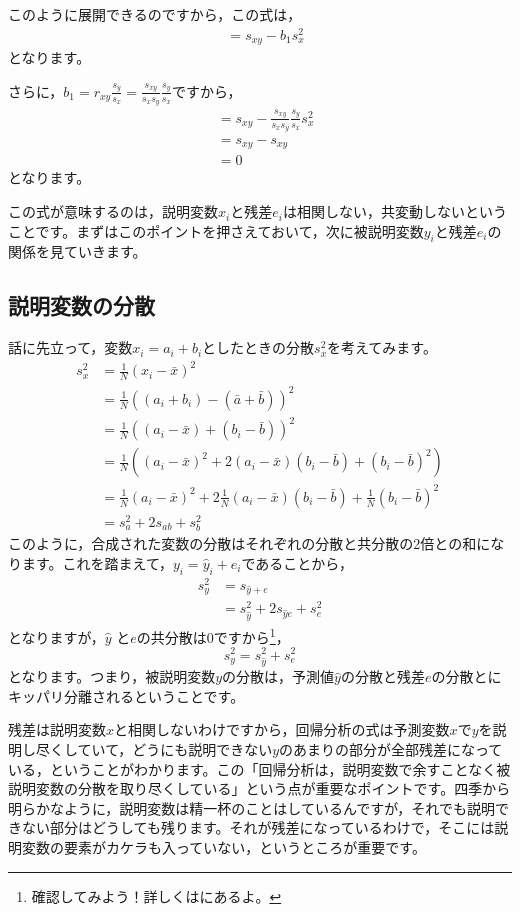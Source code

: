 \documentclass{ltjbook}
\begin{document}
このように展開できるのですから，この式は，
\begin{align}
	&= s_{xy} - b_1 s_{x}^2
\end{align}
となります。

さらに，$b_1 = r_{xy}\frac{s_y}{s_x} = \frac{s_{xy}}{s_xs_y} \frac{s_y}{s_x}$ですから，
\begin{align}
	&= s_{xy} - \frac{s_{xy}}{s_xs_y} \frac{s_y}{s_x}s_{x}^2\\
	&= s_{xy} - s_{xy} \\
	&= 0
\end{align}
となります。

この式が意味するのは，説明変数$x_i$と残差$e_i$は相関しない，共変動しないということです。まずはこのポイントを押さえておいて，次に被説明変数$y_i$と残差$e_i$の関係を見ていきます。

\subsection{説明変数の分散}
話に先立って，変数$x_i = a_i+b_i$としたときの分散$s_x^2$を考えてみます。
\begin{align}
s_x^2 &= \frac{1}{N}(x_i - \bar{x})^2\\
&= \frac{1}{N}((a_i + b_i) - (\bar{a} + \bar{b}))^2\\
&= \frac{1}{N}((a_i - \bar{x}) + (b_i - \bar{b}))^2\\
&= \frac{1}{N}((a_i - \bar{x})^2 + 2(a_i - \bar{x})(b_i - \bar{b}) + (b_i - \bar{b})^2)\\
&= \frac{1}{N}(a_i - \bar{x})^2 + 2\frac{1}{N}(a_i - \bar{x})(b_i - \bar{b})  + \frac{1}{N}(b_i - \bar{b})^2\\
&= s_a^2 + 2s_{ab} + s_b^2
\end{align}
このように，合成された変数の分散はそれぞれの分散と共分散の2倍との和になります。これを踏まえて，$y_i = \hat{y}_i + e_i$であることから，
\begin{align}
	s_{y}^2 &= s_{\hat{y}+e}\\
	& = s_{\hat{y}}^2 + 2s_{\hat{y}e} + s_e^2
\end{align}
となりますが，$\hat{y}$ と$e$の共分散は$0$ですから\footnote{確認してみよう！詳しくは\textcite{kosugi2018}にあるよ。}，
\[ s_y^2 = s_{\hat{y}}^2 + s_e^2 \]
となります。つまり，被説明変数$y$の分散は，予測値$\hat{y}$の分散と残差$e$の分散とにキッパリ分離されるということです。

残差は説明変数$x$と相関しないわけですから，回帰分析の式は予測変数$x$で$y$を説明し尽くしていて，どうにも説明できない$y$のあまりの部分が全部残差になっている，ということがわかります。この「回帰分析は，説明変数で余すことなく被説明変数の分散を取り尽くしている」という点が重要なポイントです。四季から明らかなように，説明変数は精一杯のことはしているんですが，それでも説明できない部分はどうしても残ります。それが残差になっているわけで，そこには説明変数の要素がカケラも入っていない，というところが重要です。
\end{document}
